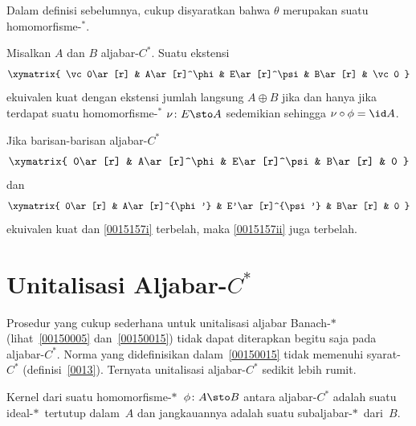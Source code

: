 \begin{prop}\label{0015152} Dalam definisi sebelumnya, cukup disyaratkan bahwa $\theta$
merupakan suatu homomorfisme-${}^*$.
\end{prop}

\begin{prop}\label{0015155} Misalkan $A$ dan $B$ aljabar-$C^*$. Suatu ekstensi
 \[\xymatrix{
     \vc 0\ar[r] & A\ar[r]^\phi & E\ar[r]^\psi & B\ar[r] & \vc 0
 }\]
ekuivalen kuat dengan ekstensi jumlah langsung $A \oplus B$ jika dan hanya jika terdapat\newline
suatu \mbox{homomorfisme-${}^*$} $\nu\colon E \sto A$ sedemikian sehingga
$\nu\circ\phi = \id A$.
\end{prop}

\begin{prop}\label{0015157} Jika barisan-barisan aljabar-$C^*$
 \begin{equation}\label{0015157i}\xymatrix{
     0\ar[r] & A\ar[r]^\phi & E\ar[r]^\psi & B\ar[r] & 0
 }\end{equation}
dan
 \begin{equation}\label{0015157ii}\xymatrix{
     0\ar[r] & A\ar[r]^{\phi'} & E'\ar[r]^{\psi'} & B\ar[r] & 0
 }\end{equation}
ekuivalen kuat dan \eqref{0015157i} terbelah, maka \eqref{0015157ii} juga terbelah.
\end{prop}

















\section{Unitalisasi Aljabar-$C^*$}
Prosedur yang cukup sederhana untuk unitalisasi aljabar Banach-$*\,$
(lihat~\ref{00150005} dan~\ref{00150015}) tidak dapat diterapkan begitu saja pada
aljabar-$C^*$. Norma yang didefinisikan dalam~\ref{00150015} tidak memenuhi syarat-$C^*$
(definisi~\ref{0013}). Ternyata unitalisasi aljabar-$C^*$ sedikit lebih rumit.

\begin{prop} Kernel dari suatu homomorfisme-$*\,$ $\phi\colon A \sto B$ antara
aljabar-$C^*$ adalah suatu ideal-$*\,$ tertutup dalam~$A$ dan jangkauannya adalah suatu
subaljabar-$*\,$ dari~$B$.
\end{prop}

